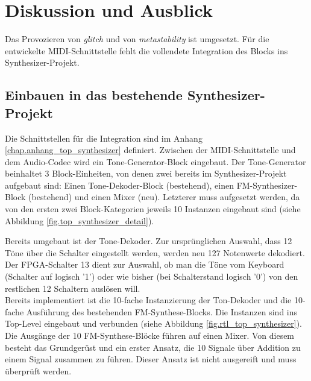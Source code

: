 
\chapter{Diskussion und Ausblick}\label{chap.diskussion}

Das Provozieren von \textit{glitch} und von \textit{metastability} ist umgesetzt. Für die entwickelte MIDI-Schnittstelle fehlt die vollendete Integration des Blocks ins Synthesizer-Projekt. 

\section{Einbauen in das bestehende Synthesizer-Projekt}

Die Schnittstellen für die Integration sind im Anhang \ref{chap.anhang_top_synthesizer} definiert. Zwischen der MIDI-Schnittstelle und dem Audio-Codec wird ein Tone-Generator-Block eingebaut. Der Tone-Generator beinhaltet 3 Block-Einheiten, von denen zwei bereits im Synthesizer-Projekt aufgebaut sind: Einen Tone-Dekoder-Block (bestehend), einen FM-Synthesizer-Block (bestehend) und einen Mixer (neu). Letzterer muss aufgesetzt werden, da von den ersten zwei Block-Kategorien jeweils 10 Instanzen eingebaut sind (siehe Abbildung \ref{fig.top_synthesizer_detail}). 

Bereits umgebaut ist der Tone-Dekoder. Zur ursprünglichen Auswahl, dass 12 Töne über die Schalter eingestellt werden, werden neu 127 Notenwerte dekodiert. Der FPGA-Schalter 13 dient zur Auswahl, ob man die Töne vom Keyboard (Schalter auf logisch '1') oder wie bisher (bei Schalterstand logisch '0') von den restlichen 12 Schaltern auslösen will.\\
Bereits implementiert ist die 10-fache Instanzierung der Ton-Dekoder und die 10-fache Ausführung des bestehenden FM-Synthese-Blocks. Die Instanzen sind ins Top-Level eingebaut und verbunden (siehe Abbildung \ref{fig.rtl_top_synthesizer}). Die Ausgänge der 10 FM-Synthese-Blöcke führen auf einen Mixer. Von diesem besteht das Grundgerüst und ein erster Ansatz, die 10 Signale über Addition zu einem Signal zusammen zu führen. Dieser Ansatz ist nicht ausgereift und muss überprüft werden.

